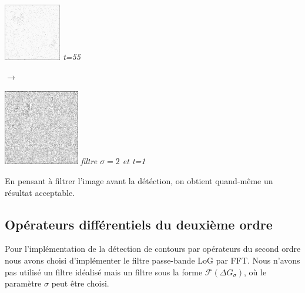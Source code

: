 \documentclass[a4,12pt]{article}
\begin{document}
\begin{minipage}[c]{0.10\linewidth}
	\begin{center}
		\includegraphics[width = 25mm]{./img/p2test_grad_fin_globules10_t55.jpg}
		\textit{t=55}
	\end{center}
\end{minipage}
\hspace{2cm}
$\longrightarrow$
\hspace{1cm}
\begin{minipage}[c]{0.10\linewidth}
	\begin{center}
		\includegraphics[width = 33mm]{./img/globulesbb10_filtre2_fin1.jpg}
		\textit{filtre $\sigma=2$ et t=1}
	\end{center}
\end{minipage}

En pensant à filtrer l'image avant la détéction, on obtient quand-même un résultat acceptable.

\subsection{Opérateurs différentiels du deuxième ordre}
Pour l'implémentation de la détection de contours par opérateurs du second ordre nous avons choisi d'implémenter le filtre passe-bande LoG par FFT. Nous n'avons pas utilisé un filtre idéalisé mais un filtre sous la forme $\mathcal{F}(\Delta G_{\sigma})$, où le paramètre $\sigma$ peut être choisi.\\
\end{document}
